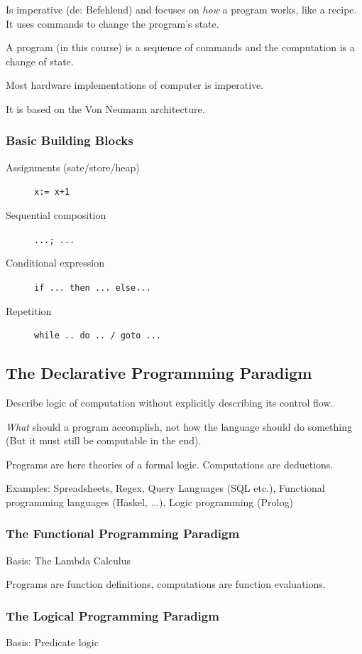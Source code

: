 Is imperative (de: Befehlend) and focuses on \emph{how} a program works, like a recipe. It uses commands to change the program's state.

A program (in this course) is a sequence of commands and the computation is a change of state.

Most hardware implementations of computer is imperative.

It is based on the Von Neumann architecture.

\subsubsection{Basic Building Blocks}

\begin{description}
	\item[Assignments (sate/store/heap)] \lstinline|x:= x+1|
	\item[Sequential composition] \lstinline|...; ...|
	\item[Conditional expression] \lstinline|if ... then ... else...|
	\item[Repetition] \lstinline|while .. do .. / goto ...|
\end{description}



\subsection{The Declarative Programming Paradigm}

Describe logic of computation without explicitly describing its control flow.

\emph{What} should a program accomplish, not how the language should do something (But it must still be computable in the end).

Programs are here theories of a formal logic. Computations are deductions.

Examples: Spreadsheets, Regex, Query Languages (SQL etc.), Functional programming languages (Haskel, ...), Logic programming (Prolog)

\subsubsection{The Functional Programming Paradigm}

Basis: The Lambda Calculus

Programs are function definitions, computations are function evaluations.

\subsubsection{The Logical Programming Paradigm}
Basis: Predicate logic

